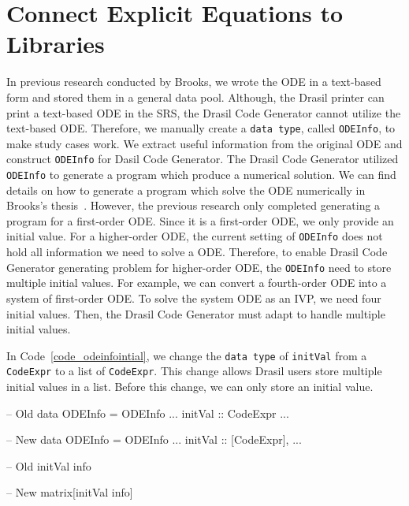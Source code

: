 \section{Connect Explicit Equations to Libraries}
\label{se_connecteetolib}

In previous research conducted by Brooks, we wrote the ODE in a text-based form and stored them in a general data pool. Although, the Drasil printer can print a text-based ODE in the SRS, the Drasil Code Generator cannot utilize the text-based ODE. Therefore, we manually create a \verb|data type|, called \verb|ODEInfo|, to make study cases work. We extract useful information from the original ODE and construct \verb|ODEInfo| for Dasil Code Generator. The Drasil Code Generator utilized \verb|ODEInfo| to generate a program which produce a numerical solution. We can find details on how to generate a program which solve the ODE numerically in Brooks's thesis~\citep{brooks}. However, the previous research only completed generating a program for a first-order ODE. Since it is a first-order ODE, we only provide an initial value. For a higher-order ODE, the current setting of \verb|ODEInfo| does not hold all information we need to solve a ODE. Therefore, to enable Drasil Code Generator generating problem for higher-order ODE, the \verb|ODEInfo| need to store multiple initial values. For example, we can convert a fourth-order ODE into a system of first-order ODE. To solve the system ODE as an IVP, we need four initial values. Then, the Drasil Code Generator must adapt to handle multiple initial values.

In Code~\ref{code_odeinfointial}, we change the \verb|data type| of \verb|initVal| from a \verb|CodeExpr| to a list of \verb|CodeExpr|. This change allows Drasil users store multiple initial values in a list. Before this change, we can only store an initial value. 

\begin{listing}[ht]
\begin{haskell1}
-- Old 
data ODEInfo = ODEInfo {
  ...
  initVal :: CodeExpr
  ...
}

-- New 
data ODEInfo = ODEInfo {
  ...
  initVal :: [CodeExpr],
  ...
}
\end{haskell1}
\label{code_odeinfointial}
\end{listing}

\begin{listing}[ht]
\begin{haskell1}
-- Old 
initVal info

-- New 
matrix[initVal info]  
\end{haskell1}
\label{code_odeinfointialcodegen}
\end{listing}

